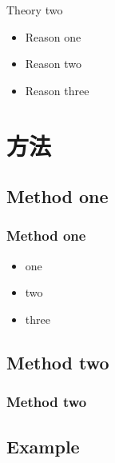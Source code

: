 \documentclass[CJKutf8, 10pt, notes]{beamer}
\begin{document}
\begin{CJK}{UTF8}{gbsn}
\begin{frame}
\begin{alertblock}{Theory two}
 \begin{itemize}
 \pause
 \item Reason one
 \pause
 \item Reason two
 \pause
 \item  Reason three

\end{itemize}
\end{alertblock}
\end{frame}



\section{方法}
\subsection{Method one}

\begin{frame} 
\frametitle{Method one}
  \begin{itemize}
  \item one

  \pause
  \item two
  \pause
  \item three
  \end{itemize}
 
\end{frame}
\subsection{Method two}
\begin{frame} 
\frametitle{Method two}
\begin{definition}
\lipsum[3]
\end{definition}
\end{frame}


\subsection{Example}


\end{CJK}
\end{document}
